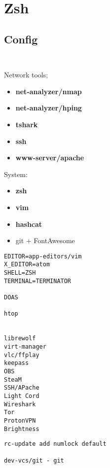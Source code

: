 \documentclass[10pt, a4paper, onecolumn, openany]{book}         %
\begin{document}
\section{Zsh}
\subsection{Config}
\begin{Verbatim}[commandchars=\\\{\}]


\end{Verbatim}


%

Network tools;
\begin{itemize}
    \item \textbf{net-analyzer/nmap}
    \item \textbf{net-analyzer/hping}
    \item \textbf{tshark}
    \item \textbf{ssh}
    \item \textbf{www-server/apache}
    
\end{itemize}



System:
\begin{itemize}

    
    \item \textbf{zsh}


    \item \textbf{vim}
    

    \item \textbf{hashcat}
    \item git + FontAwesome
\end{itemize}



\begin{Verbatim}[commandchars=\\\{\}]
EDITOR=app-editors/vim
X_EDITOR=atom
SHELL=ZSH
TERMINAL=TERMINATOR

DOAS

htop


librewolf
virt-manager
vlc/ffplay
keepass
OBS
SteaM
SSH/APache
Light Cord
Wireshark
Tor
ProtonVPN
Brightness
\end{Verbatim}

\begin{Verbatim}[commandchars=\\\{\}]
rc-update add numlock default

dev-vcs/git - git
\end{Verbatim}
\end{document}

